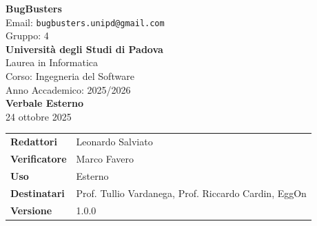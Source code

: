 \documentclass[a4paper,12pt]{article}
\newcommand{\CurrentVersion}{1.0.0}
\begin{document}
\begin{center}  
  
  {\Large\bfseries\color{primaryblue} BugBusters}\\[0.3cm]
  {\small\color{darkgray} Email: \texttt{bugbusters.unipd@gmail.com}} \\[0.1cm]
  {\small\color{darkgray} Gruppo: 4} \\[0.5cm]

  {\large\bfseries Università degli Studi di Padova}\\[0.3cm]
  {\small Laurea in Informatica}\\[0.2cm]
  {\small Corso: Ingegneria del Software}\\[0.2cm]
  {\small Anno Accademico: 2025/2026}\\[0.8cm]

  {\Huge\bfseries\color{primaryblue} Verbale Esterno}\\[0.3cm]
  {\Large\color{secondaryblue} 24 ottobre 2025}\\[0.8cm]
\end{center}

\begin{center}
\begin{tcolorbox}[colback=lightgray,colframe=primaryblue,width=0.85\textwidth,arc=3mm,boxrule=0.5pt]
\begin{tabular}{@{}ll@{}}
\textbf{Redattori}    & Leonardo Salviato \\
\textbf{Verificatore}    & Marco Favero \\
\textbf{Uso}          & Esterno \\
\textbf{Destinatari}  & Prof. Tullio Vardanega, Prof. Riccardo Cardin, EggOn \\
\textbf{Versione} & \CurrentVersion \\

\end{tabular}
\end{tcolorbox}
\end{center}
\end{document}
